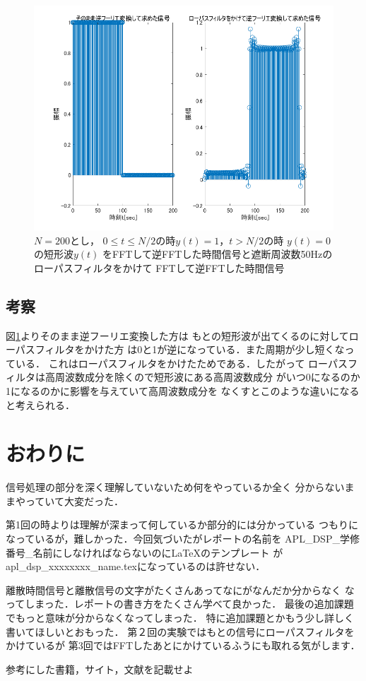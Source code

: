 \documentclass[11pt, a4paper, titlepage]{ltjsarticle}
\begin{document}
\begin{figure}[h]
    \centering
    \includegraphics[width=0.9\linewidth]{figures/3-A.png}
    \caption{$N=200$とし，
$0\leq t \leq N/2$の時$y(t)=1$，$t>N/2$の時
$y(t)=0$の短形波$y(t)$
        をFFTして逆FFTした時間信号と遮断周波数50Hzのローパスフィルタをかけて
    FFTして逆FFTした時間信号}
    \label{fign:3-A}
\end{figure}

\subsection*{考察}
図\ref*{fign:3-A}よりそのまま逆フーリエ変換した方は
もとの短形波が出てくるのに対してローパスフィルタをかけた方
は0と1が逆になっている．また周期が少し短くなっている．
これはローパスフィルタをかけたためである．したがって
ローパスフィルタは高周波数成分を除くので短形波にある高周波数成分
がいつ0になるのか1になるのかに影響を与えていて高周波数成分を
なくすとこのような違いになると考えられる．

\newpage
\section*{おわりに}

信号処理の部分を深く理解していないため何をやっているか全く
分からないままやっていて大変だった．

第1回の時よりは理解が深まって何しているか部分的には分かっている
つもりになっているが，難しかった．今回気づいたがレポートの名前を
APL\_DSP\_学修番号\_名前にしなければならないのにLaTeXのテンプレート
がapl\_dsp\_xxxxxxxx\_name.texになっているのは許せない．

離散時間信号と離散信号の文字がたくさんあってなにがなんだか分からなく
なってしまった．レポートの書き方をたくさん学べて良かった．
最後の追加課題でもっと意味が分からなくなってしまった．
特に追加課題とかもう少し詳しく書いてほしいとおもった．
第２回の実験ではもとの信号にローパスフィルタをかけているが
第3回ではFFTしたあとにかけているふうにも取れる気がします．
\begin{thebibliography}{99}
    参考にした書籍，サイト，文献を記載せよ
    
\end{thebibliography}
\end{document}
